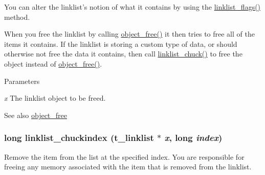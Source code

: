 You can alter the linklist's notion of what it contains by using the \hyperlink{group__linklist_gacb89cb9e0a3b6c8e631dd00734643cdb}{linklist\_\-flags()} method.

When you free the linklist by calling \hyperlink{group__obj_ga3759846cb356195532c41e35b87522ee}{object\_\-free()} it then tries to free all of the items it contains. If the linklist is storing a custom type of data, or should otherwise not free the data it contains, then call \hyperlink{group__linklist_ga033f4bf2a9f806e168697b5ce0f6331e}{linklist\_\-chuck()} to free the object instead of \hyperlink{group__obj_ga3759846cb356195532c41e35b87522ee}{object\_\-free()}.


\begin{DoxyParams}{Parameters}
\item[{\em x}]The linklist object to be freed. \end{DoxyParams}
\begin{DoxySeeAlso}{See also}
\hyperlink{group__obj_ga3759846cb356195532c41e35b87522ee}{object\_\-free} 
\end{DoxySeeAlso}
\hypertarget{group__linklist_gaa89cf5b917b41ad0c15963dd79800b50}{
\subsubsection[{linklist\_\-chuckindex}]{\setlength{\rightskip}{0pt plus 5cm}long linklist\_\-chuckindex ({\bf t\_\-linklist} $\ast$ {\em x}, \/  long {\em index})}}
\label{group__linklist_gaa89cf5b917b41ad0c15963dd79800b50}


Remove the item from the list at the specified index. You are responsible for freeing any memory associated with the item that is removed from the linklist.



